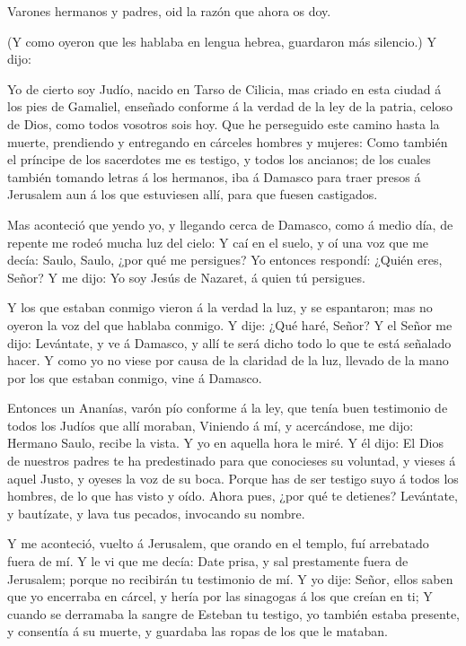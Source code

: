  Varones hermanos y padres, oid la razón que ahora os doy.

 (Y como oyeron que les hablaba en lengua hebrea, guardaron
más silencio.) Y dijo:

 Yo de cierto soy Judío, nacido en Tarso de Cilicia, mas
criado en esta ciudad á los pies de Gamaliel, enseñado conforme á la
verdad de la ley de la patria, celoso de Dios, como todos vosotros sois
hoy.  Que he perseguido este camino hasta la muerte,
prendiendo y entregando en cárceles hombres y mujeres:  Como
también el príncipe de los sacerdotes me es testigo, y todos los
ancianos; de los cuales también tomando letras á los hermanos, iba á
Damasco para traer presos á Jerusalem aun á los que estuviesen allí,
para que fuesen castigados.

 Mas aconteció que yendo yo, y llegando cerca de Damasco,
como á medio día, de repente me rodeó mucha luz del cielo: 
Y caí en el suelo, y oí una voz que me decía: Saulo, Saulo, ¿por qué me
persigues?  Yo entonces respondí: ¿Quién eres, Señor? Y me
dijo: Yo soy Jesús de Nazaret, á quien tú persigues.

 Y los que estaban conmigo vieron á la verdad la luz, y se
espantaron; mas no oyeron la voz del que hablaba conmigo. 
Y dije: ¿Qué haré, Señor? Y el Señor me dijo: Levántate, y ve á Damasco,
y allí te será dicho todo lo que te está señalado hacer.  Y
como yo no viese por causa de la claridad de la luz, llevado de la mano
por los que estaban conmigo, vine á Damasco.

 Entonces un Ananías, varón pío conforme á la ley, que
tenía buen testimonio de todos los Judíos que allí moraban,
 Viniendo á mí, y acercándose, me dijo: Hermano Saulo,
recibe la vista. Y yo en aquella hora le miré.  Y él dijo:
El Dios de nuestros padres te ha predestinado para que conocieses su
voluntad, y vieses á aquel Justo, y oyeses la voz de su boca.
 Porque has de ser testigo suyo á todos los hombres, de lo
que has visto y oído.  Ahora pues, ¿por qué te detienes?
Levántate, y bautízate, y lava tus pecados, invocando su nombre.

 Y me aconteció, vuelto á Jerusalem, que orando en el
templo, fuí arrebatado fuera de mí.  Y le vi que me decía:
Date prisa, y sal prestamente fuera de Jerusalem; porque no recibirán tu
testimonio de mí.  Y yo dije: Señor, ellos saben que yo
encerraba en cárcel, y hería por las sinagogas á los que creían en ti;
 Y cuando se derramaba la sangre de Esteban tu testigo, yo
también estaba presente, y consentía á su muerte, y guardaba las ropas
de los que le mataban.

